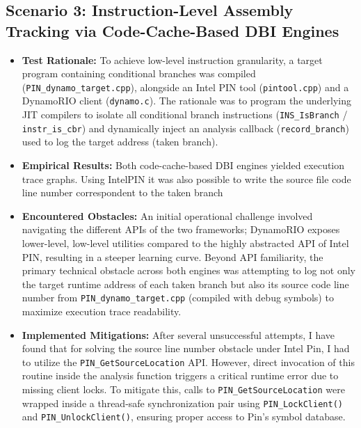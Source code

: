 \subsection{Scenario 3: Instruction-Level Assembly Tracking via Code-Cache-Based DBI Engines}
\label{subsec:scenario_3}

\begin{itemize}
	\item \textbf{Test Rationale:} To achieve low-level instruction granularity, a target program containing conditional branches was compiled (\texttt{PIN\_\allowbreak dynamo\_\allowbreak target.cpp}), alongside an Intel PIN tool (\texttt{pintool.cpp}) and a DynamoRIO client (\texttt{dynamo.c}). The rationale was to program the underlying JIT compilers to isolate all conditional branch instructions (\texttt{INS\_IsBranch} / \texttt{instr\_is\_cbr}) and dynamically inject an analysis callback (\texttt{record\_branch}) used to log the target address (taken branch).
	
	\item \textbf{Empirical Results:} Both code-cache-based \ac{DBI} engines yielded execution trace graphs. Using IntelPIN it was also possible to write the source file code line number correspondent to the taken branch
	
	\item \textbf{Encountered Obstacles:} An initial operational challenge involved navigating the different APIs of the two frameworks; DynamoRIO exposes lower-level, low-level utilities compared to the highly abstracted API of Intel PIN, resulting in a steeper learning curve. Beyond API familiarity, the primary technical obstacle across both engines was attempting to log not only the target runtime address of each taken branch but also its source code line number from \texttt{PIN\_dynamo\_target.cpp} (compiled with debug symbols) to maximize execution trace readability.
	
	\item \textbf{Implemented Mitigations:} After several unsuccessful attempts, I have found that for solving the source line number obstacle under Intel Pin, I had to utilize the \texttt{PIN\_GetSourceLocation} API. However, direct invocation of this routine inside the analysis function triggers a critical runtime error due to missing client locks. To mitigate this, calls to \texttt{PIN\_GetSourceLocation} were wrapped inside a thread-safe synchronization pair using \texttt{PIN\_LockClient()} and \texttt{PIN\_UnlockClient()}, ensuring proper access to Pin's symbol database.
\end{itemize}